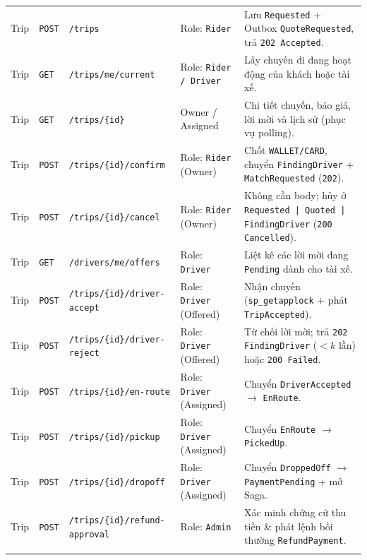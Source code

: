 \documentclass[12pt,a4paper]{article}
\begin{document}
{\begin{longtable}{L{1.8cm} L{1.1cm} L{4.2cm} L{2.5cm} L{4.7cm}}
Trip & \texttt{POST} & \texttt{/trips} & Role: \texttt{Rider} & Lưu \texttt{Requested} + Outbox \texttt{QuoteRequested}, trả \texttt{202 Accepted}. \\
Trip & \texttt{GET} & \texttt{/trips/me/current} & Role: \texttt{Rider / Driver} & Lấy chuyến đi đang hoạt động của khách hoặc tài xế. \\
Trip & \texttt{GET} & \texttt{/trips/\{id\}} & Owner / Assigned & Chi tiết chuyến, báo giá, lời mời và lịch sử (phục vụ polling). \\
Trip & \texttt{POST} & \texttt{/trips/\{id\}/confirm} & Role: \texttt{Rider} (Owner) & Chốt \texttt{WALLET/CARD}, chuyển \texttt{FindingDriver} + \texttt{MatchRequested} (\texttt{202}). \\
Trip & \texttt{POST} & \texttt{/trips/\{id\}/cancel} & Role: \texttt{Rider} (Owner) & Không cần body; hủy ở \texttt{Requested | Quoted | FindingDriver} (\texttt{200 Cancelled}). \\
Trip & \texttt{GET} & \texttt{/drivers/me/offers} & Role: \texttt{Driver} & Liệt kê các lời mời đang \texttt{Pending} dành cho tài xế. \\
Trip & \texttt{POST} & \texttt{/trips/\{id\}/driver-accept} & Role: \texttt{Driver} (Offered) & Nhận chuyến (\texttt{sp\_getapplock} + phát \texttt{TripAccepted}). \\
Trip & \texttt{POST} & \texttt{/trips/\{id\}/driver-reject} & Role: \texttt{Driver} (Offered) & Từ chối lời mời; trả \texttt{202 FindingDriver} ($< k$ lần) hoặc \texttt{200 Failed}. \\
Trip & \texttt{POST} & \texttt{/trips/\{id\}/en-route} & Role: \texttt{Driver} (Assigned) & Chuyển \texttt{DriverAccepted} $\rightarrow$ \texttt{EnRoute}. \\
Trip & \texttt{POST} & \texttt{/trips/\{id\}/pickup} & Role: \texttt{Driver} (Assigned) & Chuyển \texttt{EnRoute} $\rightarrow$ \texttt{PickedUp}. \\
Trip & \texttt{POST} & \texttt{/trips/\{id\}/dropoff} & Role: \texttt{Driver} (Assigned) & Chuyển \texttt{DroppedOff} $\rightarrow$ \texttt{PaymentPending} + mở Saga. \\
Trip & \texttt{POST} & \texttt{/trips/\{id\}/refund-approval} & Role: \texttt{Admin} & Xác minh chứng cứ thu tiền \& phát lệnh bồi thường \texttt{RefundPayment}. \\
\addlinespace


\end{longtable}}
\end{document}
